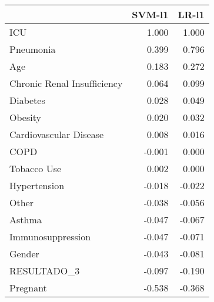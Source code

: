 \begin{tabular}{lrr}
\toprule
{} &  SVM-l1 &  LR-l1 \\
\midrule
ICU                         &   1.000 &  1.000 \\
Pneumonia                   &   0.399 &  0.796 \\
Age                         &   0.183 &  0.272 \\
Chronic Renal Insufficiency &   0.064 &  0.099 \\
Diabetes                    &   0.028 &  0.049 \\
Obesity                     &   0.020 &  0.032 \\
Cardiovascular Disease      &   0.008 &  0.016 \\
COPD                        &  -0.001 &  0.000 \\
Tobacco Use                 &   0.002 &  0.000 \\
Hypertension                &  -0.018 & -0.022 \\
Other                       &  -0.038 & -0.056 \\
Asthma                      &  -0.047 & -0.067 \\
Immunosuppression           &  -0.047 & -0.071 \\
Gender                      &  -0.043 & -0.081 \\
RESULTADO\_3                 &  -0.097 & -0.190 \\
Pregnant                    &  -0.538 & -0.368 \\
\bottomrule
\end{tabular}
